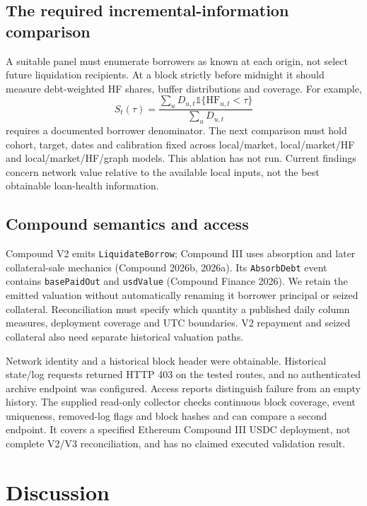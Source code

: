 \documentclass[
  10pt,
  a4paper,
]{article}
\begin{document}
\subsection{The required incremental-information
comparison}\label{the-required-incremental-information-comparison}

A suitable panel must enumerate borrowers as known at each origin, not
select future liquidation recipients. At a block strictly before
midnight it should measure debt-weighted HF shares, buffer distributions
and coverage. For example,
\[S_t(\tau)=\frac{\sum_u D_{u,t}\mathbb{1}\{\mathrm{HF}_{u,t}<\tau\}}{\sum_u D_{u,t}}\]
requires a documented borrower denominator. The next comparison must
hold cohort, target, dates and calibration fixed across local/market,
local/market/HF and local/market/HF/graph models. This ablation has not
run. Current findings concern network value relative to the available
local inputs, not the best obtainable loan-health information.

\subsection{Compound semantics and
access}\label{compound-semantics-and-access}

Compound V2 emits \texttt{LiquidateBorrow}; Compound III uses absorption
and later collateral-sale mechanics (Compound 2026b, 2026a). Its
\texttt{AbsorbDebt} event contains \texttt{basePaidOut} and
\texttt{usdValue} (Compound Finance 2026). We retain the emitted
valuation without automatically renaming it borrower principal or seized
collateral. Reconciliation must specify which quantity a published daily
column measures, deployment coverage and UTC boundaries. V2 repayment
and seized collateral also need separate historical valuation paths.

Network identity and a historical block header were obtainable.
Historical state/log requests returned HTTP 403 on the tested routes,
and no authenticated archive endpoint was configured. Access reports
distinguish failure from an empty history. The supplied read-only
collector checks continuous block coverage, event uniqueness,
removed-log flags and block hashes and can compare a second endpoint. It
covers a specified Ethereum Compound III USDC deployment, not complete
V2/V3 reconciliation, and has no claimed executed validation result.

\section{Discussion}\label{discussion}
\end{document}
